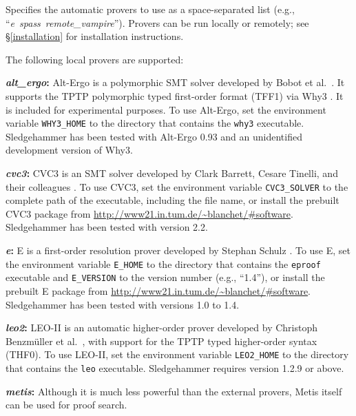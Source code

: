 \documentclass[a4paper,12pt]{article}
\newcommand\download{\url{http://www21.in.tum.de/~blanchet/\#software}}
\begin{document}
\begin{enum}
Specifies the automatic provers to use as a space-separated list (e.g.,
``\textit{e}~\textit{spass}~\textit{remote\_vampire\/}'').
Provers can be run locally or remotely; see \S\ref{installation} for
installation instructions.

The following local provers are supported:

\begin{enum}
\item[\labelitemi] \textbf{\textit{alt\_ergo}:} Alt-Ergo is a polymorphic
SMT solver developed by Bobot et al.\ \cite{alt-ergo}.
It supports the TPTP polymorphic typed first-order format (TFF1) via Why3
\cite{why3}. It is included for experimental purposes. To use Alt-Ergo, set the
environment variable \texttt{WHY3\_HOME} to the directory that contains the
\texttt{why3} executable. Sledgehammer has been tested with Alt-Ergo 0.93 and an
unidentified development version of Why3.

\item[\labelitemi] \textbf{\textit{cvc3}:} CVC3 is an SMT solver developed by
Clark Barrett, Cesare Tinelli, and their colleagues \cite{cvc3}. To use CVC3,
set the environment variable \texttt{CVC3\_SOLVER} to the complete path of the
executable, including the file name, or install the prebuilt CVC3 package from
\download. Sledgehammer has been tested with version 2.2.

\item[\labelitemi] \textbf{\textit{e}:} E is a first-order resolution prover
developed by Stephan Schulz \cite{schulz-2002}. To use E, set the environment
variable \texttt{E\_HOME} to the directory that contains the \texttt{eproof}
executable and \texttt{E\_VERSION} to the version number (e.g., ``1.4''), or
install the prebuilt E package from \download. Sledgehammer has been tested with
versions 1.0 to 1.4.

\item[\labelitemi] \textbf{\textit{leo2}:} LEO-II is an automatic
higher-order prover developed by Christoph Benzm\"uller et al.\ \cite{leo2},
with support for the TPTP typed higher-order syntax (THF0). To use LEO-II, set
the environment variable \texttt{LEO2\_HOME} to the directory that contains the
\texttt{leo} executable. Sledgehammer requires version 1.2.9 or above.

\item[\labelitemi] \textbf{\textit{metis}:} Although it is much less powerful than
the external provers, Metis itself can be used for proof search.


\end{enum}
\end{enum}
\end{document}
